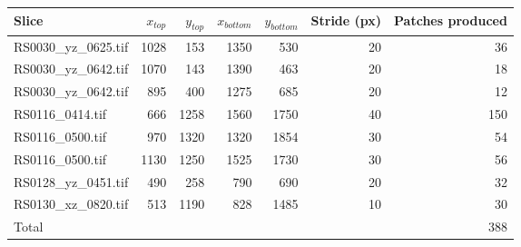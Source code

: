 \begin{tabular}{@{}lrrrrrr@{}}
\toprule
Slice & $x_{top}$ & $y_{top}$ & $x_{bottom}$ & $y_{bottom}$ & Stride (px) & Patches produced \\ \midrule
RS0030\_yz\_0625.tif    & 1028      & 153       & 1350         & 530          & 20          & 36      \\
RS0030\_yz\_0642.tif    & 1070      & 143       & 1390         & 463          & 20          & 18      \\
RS0030\_yz\_0642.tif    & 895       & 400       & 1275         & 685          & 20          & 12      \\
RS0116\_0414.tif        & 666       & 1258      & 1560         & 1750         & 40          & 150     \\
RS0116\_0500.tif        & 970       & 1320      & 1320         & 1854         & 30          & 54      \\
RS0116\_0500.tif        & 1130      & 1250      & 1525         & 1730         & 30          & 56      \\
RS0128\_yz\_0451.tif    & 490       & 258       & 790          & 690          & 20          & 32      \\
RS0130\_xz\_0820.tif    & 513       & 1190      & 828          & 1485         & 10          & 30      \\ \midrule
Total                   &           &           &              &              &             & 388     \\ \bottomrule
\end{tabular}